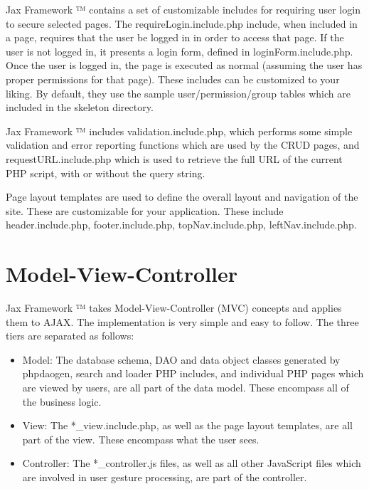 \documentclass[letterpaper,10pt,english]{sphinxmanual}
\begin{document}
Jax Framework ™ contains a set of customizable includes for requiring user login to secure
selected pages.  The requireLogin.include.php include, when included in a page, requires that the
user be logged in in order to access that page.  If the user is not logged in, it presents a login
form, defined in loginForm.include.php.  Once the user is logged in, the page is executed as normal
(assuming the user has proper permissions for that page).  These includes can be customized to your
liking.  By default, they use the sample user/permission/group tables which are included in the
skeleton directory.

Jax Framework ™ includes validation.include.php, which performs some simple validation and
error reporting functions which are used by the CRUD pages, and requestURL.include.php which is
used to retrieve the full URL of the current PHP script, with or without the query string.

Page layout templates are used to define the overall layout and navigation of the site.  These are
customizable for your application.  These include header.include.php, footer.include.php,
topNav.include.php, leftNav.include.php.


\section{Model-View-Controller}
\label{jaxFrameworkGuide:model-view-controller}
Jax Framework ™ takes Model-View-Controller (MVC) concepts and applies them to AJAX.  The
implementation is very simple and easy to follow.  The three tiers are separated as follows:
\begin{itemize}
\item {} 
Model: The database schema, DAO and data object classes generated by phpdaogen, search and loader
PHP includes, and individual PHP pages which are viewed by users, are all part of the data model.
These encompass all of the business logic.

\item {} 
View: The *\_view.include.php, as well as the page layout templates, are all part of the view.
These encompass what the user sees.

\item {} 
Controller: The *\_controller.js files, as well as all other JavaScript files which are involved
in user gesture processing, are part of the controller.

\end{itemize}
\end{document}
